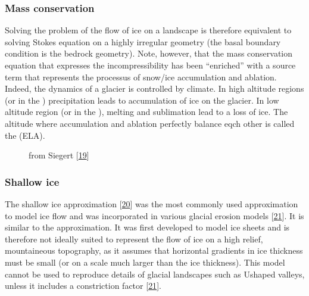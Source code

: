 \documentclass[letterpaper,10pt,english]{jupyterBook}
\let\sphinxpxdimen\pdfpxdimen\else\newdimen\sphinxpxdimen
\begin{document}
\subsubsection{Mass conservation}
\label{\detokenize{glacial-models:mass-conservation}}
\sphinxAtStartPar
Solving the problem of the flow of ice on a landscape is therefore equivalent to solving Stokes equation on a highly irregular geometry (the basal boundary condition is the bedrock geometry). Note, however, that the mass conservation equation that expresses the incompressibility has been “enriched” with a source term that represents the processus of snow/ice accumulation and ablation. Indeed, the dynamics of a glacier is controlled by climate. In high altitude regions (or in the ) precipitation leads to accumulation of ice on the glacier. In low altitude region (or in the ), melting and sublimation lead to a loss of ice. The altitude where accumulation and ablation perfectly balance eqch other is called the  (ELA).

\begin{figure}[htbp]
\centering
\capstart

\noindent\sphinxincludegraphics[height=300\sphinxpxdimen]{{ice-balance}.png}
\caption{from Siegert {[}\hyperlink{cite.references:id19}{19}{]}}\label{\detokenize{glacial-models:ice-balance}}\end{figure}


\subsubsection{Shallow ice}
\label{\detokenize{glacial-models:shallow-ice}}
\sphinxAtStartPar
The shallow ice approximation {[}\hyperlink{cite.references:id16}{20}{]} was the most commonly used approximation to model ice flow and was incorporated in various glacial erosion models {[}\hyperlink{cite.references:id14}{21}{]}. It is similar to the {\hyperref[\detokenize{thinsheet:thin-sheet-section}]{}} approximation. It was first developed to model ice sheets and is therefore not ideally suited to represent the flow of ice on a high relief, mountaineous topography, as it assumes that horizontal gradients in ice thickness must be small (or on a scale much larger than the ice thickness). This model cannot be used to reproduce details of glacial landscapes such as U\sphinxhyphen{}shaped valleys, unless it includes a constriction factor {[}\hyperlink{cite.references:id14}{21}{]}.
\end{document}
